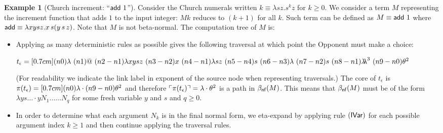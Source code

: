 \documentclass{article}
\theoremstyle{definition}
\newtheorem{example}{Example}[section]
\newcommand{\ghostlmd}{{\lambda\!\!\lambda}}
\newcommand{\ghostvar}{\theta}
\def\coresymbol{\pi} %
\newcommand{\core}[1]{\coresymbol(#1)} %
\begin{document}
\begin{example}[Church increment: ``${\sf add}\ 1$'']
Consider the Church numerals written $k \equiv\lambda s z . s^k z$ for $k\geq0$. We consider a term $M$ representing the increment function that adds $1$ to the input integer: $M k$ reduces to $(k+1)$ for all $k$. Such term can be defined as $M \equiv{\sf add}\ 1$ where
${\sf add} \equiv \lambda x y s z. x\, s (y\, s\, z)$.
Note that $M$ is not beta-normal.
The computation tree of $M$ is:

\begin{itemize}
\item Applying as many deterministic rules as possible gives the following traversal at which point the Opponent must make a choice:

$t_\epsilon = \Pstr[0.7cm]{(n0){\lambda }\ (n1){@}\ (n2-n1){\lambda x y s z}\ (n3-n2){x}\ (n4-n1){\lambda s z}\ (n5-n4){s}\ (n6-n3){\lambda }\ (n7-n2){s}\ (n8-n1){\ghostlmd^3}\ (n9-n0){\ghostvar^2} }$

(For readability we indicate the link label in exponent of the source node when representing traversals.)
The core of $t_\epsilon$ is
$\core{t_\epsilon} = \Pstr[0.7cm]{(n0){\lambda} \cdot (n9-n0){{\ghostvar^2}} }$
and therefore $\pview{\core{t_\epsilon}} =  \lambda\cdot \ghostvar^2$ is a path in  $\beta_{\sf nf}(M)$.
This means that $\beta_{\sf nf}(M)$ must be of the form $\lambda y s \ldots \cdot y N_1 \ldots \ldots N_q$ for some fresh variable $y$ and $s$ and $q\geq0$.

\item In order to determine what each argument $N_k$ is in the final normal form, we eta-expand by applying rule $\mathbf{({\sf IVar})}$ for each possible argument index $k\geq 1$ and then continue applying the traversal rules.


\end{itemize}
\end{example}
\end{document}

